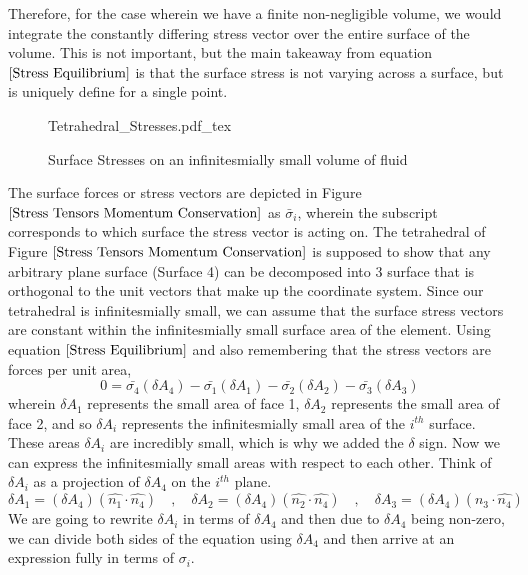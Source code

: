 Therefore, for the case wherein we have a finite non-negligible volume, we would integrate the constantly differing stress vector over the entire surface of the volume.
This is not important, but the main takeaway from equation $\ref{Stress Equilibrium}$ is that the surface stress is not varying across a surface, but is uniquely define for a single point.
\begin{figure}[H]\centering
\def\svgwidth{400px}
{Tetrahedral_Stresses.pdf_tex}
\caption{Surface Stresses on an infinitesmially small volume of fluid}
\label{Stress Tensors Momentum Conservation}
\end{figure}
The surface forces or stress vectors are depicted in Figure $\ref{Stress Tensors Momentum Conservation}$ as $\bar{\sigma}_{i}$, wherein the subscript corresponds to which surface the stress vector is acting on.
The tetrahedral of Figure $\ref{Stress Tensors Momentum Conservation}$ is supposed to show that any arbitrary plane surface (Surface 4) can be decomposed into $3$ surface that is orthogonal to the unit vectors that make up the coordinate system.
Since our tetrahedral is infinitesmially small, we can assume that the surface stress vectors are constant within the infinitesmially small surface area of the element.
Using equation $\ref{Stress Equilibrium}$ and also remembering that the stress vectors are forces per unit area,
\begin{equation}0 = \bar{\sigma_{4}}(\delta A_{4}) - \bar{\sigma_{1}}(\delta A_{1}) - \bar{\sigma_{2}}(\delta A_{2}) - \bar{\sigma_{3}}(\delta A_{3}) \label{Stress Vectors Momentum Conservation Primitive q}\end{equation}
wherein $\delta A_{1}$ represents the small area of face 1,  $\delta A_{2}$ represents the small area of face 2, and so $\delta A_{i}$ represents the infinitesmially small area of the $i^{th}$ surface.
These areas $\delta A_{i}$ are incredibly small, which is why we added the $\delta$ sign.
Now we can express the infinitesmially small areas with respect to each other. 
Think of $\delta A_{i}$ as a projection of $\delta A_{4}$ on the $i^{th}$ plane.
$$\delta A_{1} = (\delta A_{4})(\hat{n_{1}}\cdot \hat{n_{4}}) \quad,\quad \delta A_{2} = (\delta A_{4})(\hat{n_{2}}\cdot \hat{n_{4}}) \quad,\quad \delta A_{3} = (\delta A_{4})(\hat{n_{3}}\cdot \hat{n_{4}})$$
We are going to rewrite $\delta A_{i}$ in terms of $\delta A_{4}$ and then due to $\delta A_{4}$ being non-zero, we can divide both sides of the equation using $\delta A_{4}$ and then arrive at an expression fully in terms of $\sigma_{i}$.
